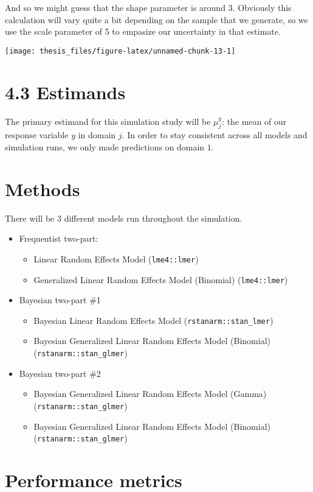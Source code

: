 \documentclass[12pt,twoside]{reedthesis}
\providecommand{\tightlist}{%
  \setlength{\itemsep}{0pt}\setlength{\parskip}{0pt}}
\begin{document}
And so we might guess that the shape parameter is around 3. Obviously this calculation will vary quite a bit depending on the sample that we generate, so we use the scale parameter of 5 to empasize our uncertainty in that estimate.
\begin{center}\texttt{[image: thesis\_files/figure-latex/unnamed-chunk-13-1]} \end{center}

\hypertarget{estimands}{%
\section{4.3 Estimands}\label{estimands}}

The primary estimand for this simulation study will be \(\mu_j^y\): the mean of our response variable \(y\) in domain \(j\). In order to stay consistent across all models and simulation runs, we only made predictions on domain \(1\).

\hypertarget{methods}{%
\section{Methods}\label{methods}}

There will be 3 different models run throughout the simulation.
\begin{itemize}
\tightlist
\item
  Frequentist two-part:
  \begin{itemize}
  \tightlist
  \item
    Linear Random Effects Model (\texttt{lme4::lmer})
  \item
    Generalized Linear Random Effects Model (Binomial) (\texttt{lme4::lmer})
  \end{itemize}
\item
  Bayesian two-part \#1
  \begin{itemize}
  \tightlist
  \item
    Bayesian Linear Random Effects Model (\texttt{rstanarm::stan\_lmer})
  \item
    Bayesian Generalized Linear Random Effects Model (Binomial) (\texttt{rstanarm::stan\_glmer})
  \end{itemize}
\item
  Bayesian two-part \#2
  \begin{itemize}
  \tightlist
  \item
    Bayesian Generalized Linear Random Effects Model (Gamma) (\texttt{rstanarm::stan\_glmer})
  \item
    Bayesian Generalized Linear Random Effects Model (Binomial) (\texttt{rstanarm::stan\_glmer})
  \end{itemize}
\end{itemize}
\hypertarget{performance-metrics}{%
\section{Performance metrics}\label{performance-metrics}}
\end{document}
